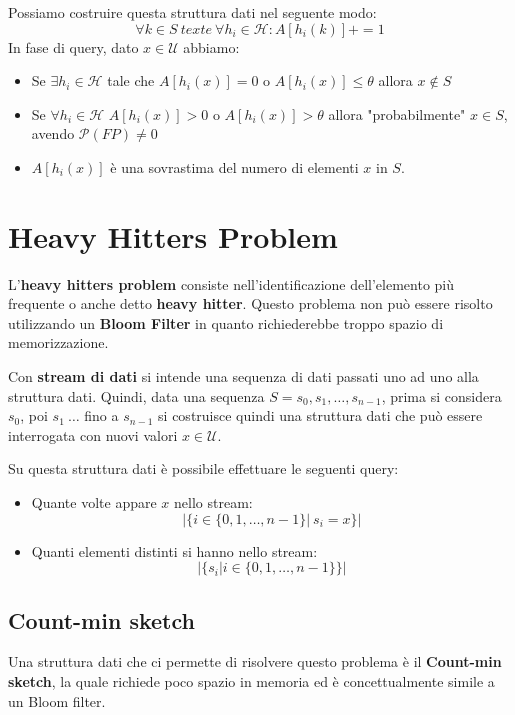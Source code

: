 Possiamo costruire questa struttura dati nel seguente modo:
\begin{equation}
    \forall k \in S \ text{e} \ \forall h_i \in \mathcal{H}: A[h_i(k)] += 1
\end{equation}
In fase di query, dato $x \in \mathcal{U}$ abbiamo:
\begin{itemize}
    \item Se $\exists h_i \in \mathcal{H}$ tale che $A[h_i(x)] = 0$ o
          $A[h_i(x)] \leq \theta$ allora $x \notin S$
    \item Se $\forall h_i \in \mathcal{H}$ $A[h_i(x)] > 0$ o $A[h_i(x)] > \theta$
          allora "probabilmente" $x \in S$, avendo $\mathcal{P}(FP) \neq 0$
    \item $A[h_i(x)]$ è una sovrastima del numero di elementi $x$ in $S$.
\end{itemize}
\section{Heavy Hitters Problem}
L'\textbf{heavy hitters problem} consiste nell'identificazione dell'elemento più
frequente o anche detto \textbf{heavy hitter}. Questo problema non può essere
risolto utilizzando un \textbf{Bloom Filter} in quanto richiederebbe troppo spazio
di memorizzazione.
\begin{definizione}
    Con \textbf{stream di dati} si intende una sequenza di dati passati uno ad
    uno alla struttura dati. Quindi, data una sequenza $S = s_0,s_1, \dots ,s_{n-1}$,
    prima si considera $s_0$, poi $s_1 \ \dots$ fino a $s_{n-1}$ si costruisce
    quindi una struttura dati che può essere interrogata con nuovi valori
    $x \in \mathcal{U}$.
\end{definizione}
Su questa struttura dati è possibile effettuare le seguenti query:
\begin{itemize}
    \item Quante volte appare $x$ nello stream:
          \begin{equation}
              | \{ i \in \{0, 1, \dots, n - 1\}| \ s_i = x \}|
          \end{equation}
    \item Quanti elementi distinti si hanno nello stream:
          \begin{equation}
              |\{s_i | i \in \{0, 1, \dots, n - 1\}\}|
          \end{equation}
\end{itemize}
\subsection{Count-min sketch}
Una struttura dati che ci permette di risolvere questo problema è il
\textbf{Count-min sketch}, la quale richiede poco spazio in memoria ed è
concettualmente simile a un Bloom filter.

